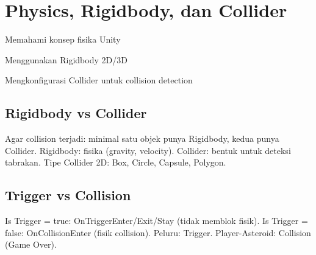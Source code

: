\section{Physics, Rigidbody, dan Collider}

\begin{learningoutcomes}
\item Memahami konsep fisika Unity
\item Menggunakan Rigidbody 2D/3D
\item Mengkonfigurasi Collider untuk collision detection
\end{learningoutcomes}

\subsection{Rigidbody vs Collider}

Agar collision terjadi: minimal satu objek punya Rigidbody, kedua punya Collider. Rigidbody: fisika (gravity, velocity). Collider: bentuk untuk deteksi tabrakan. Tipe Collider 2D: Box, Circle, Capsule, Polygon.

\subsection{Trigger vs Collision}

Is Trigger = true: OnTriggerEnter/Exit/Stay (tidak memblok fisik). Is Trigger = false: OnCollisionEnter (fisik collision). Peluru: Trigger. Player-Asteroid: Collision (Game Over).
